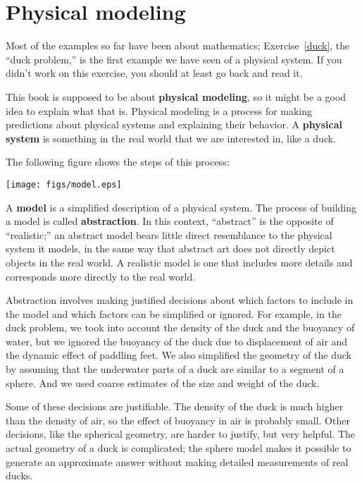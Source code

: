 \section{Physical modeling}
\label{modeling}

Most of the examples so far have been about mathematics;
Exercise~\ref{duck}, the ``duck problem,'' is the first example we
have seen of a physical system. If you didn't work on this exercise,
you should at least go back and read it.

This book is supposed to be about {\bf physical modeling}, so it might
be a good idea to explain what that is. Physical modeling is a process
for making predictions about physical systems and explaining their
behavior. A {\bf physical system} is something in the real
world that we are interested in, like a duck.

The following figure shows the steps of this process:

\beforefig \centerline{\texttt{[image: figs/model.eps]}}

A {\bf model} is a simplified description of a physical system. The
process of building a model is called {\bf abstraction}. In this
context, ``abstract'' is the opposite of ``realistic;'' an abstract
model bears little direct resemblance to the physical system it
models, in the same way that abstract art does not directly depict
objects in the real world. A realistic model is one that includes
more details and corresponds more directly to the real world.

Abstraction involves making justified decisions about which factors to
include in the model and which factors can be simplified or ignored.
For example, in the duck problem, we took into account the density of
the duck and the buoyancy of water, but we ignored the buoyancy of the
duck due to displacement of air and the dynamic effect of paddling
feet. We also simplified the geometry of the duck by assuming that
the underwater parts of a duck are similar to a segment of a sphere.
And we used coarse estimates of the size and weight of the duck.

Some of these decisions are justifiable. The density of the duck
is much higher than the density of air, so the effect of buoyancy
in air is probably small. Other decisions, like the spherical
geometry, are harder to justify, but very helpful. The actual
geometry of a duck is complicated; the sphere model makes it possible
to generate an approximate answer without making detailed measurements
of real ducks.

